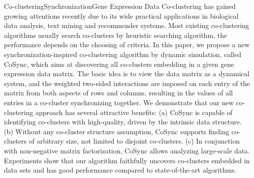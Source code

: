 
\addtocounter{page}{-1}
\begin{Eabstract}{Co-clustering}{Synchronization}{Gene Expression Data}{}{}
Co-clustering has gained growing attentions recently due to its wide practical applications in biological data analysis, text mining and recommender systems. Most existing co-clustering algorithms usually search co-clusters by heuristic searching algorithm, the performance depends on the choosing of criteria. In this paper, we propose a new synchronization-inspired co-clustering algorithm by dynamic simulation, called CoSync, which aims at discovering all co-clusters embedding in a given gene expression data matrix. The basic idea is to view the data matrix as a dynamical system, and the weighted two-sided interactions are imposed on each entry of the matrix from both aspects of rows and columns,  resulting in the values of all entries in a co-cluster synchronizing together. We demonstrate that our new co-clustering approach has several attractive benefits: (a) CoSync is capable of identifying co-clusters with high-quality, driven by the intrinsic data structure. (b) Without any co-cluster structure assumption, CoSync supports finding co-clusters of arbitrary size, not limited to disjoint co-clusters.  (c)  In conjunction with non-negative matrix factorization, CoSync allows analyzing large-scale data. Experiments show that our algorithm faithfully uncovers co-clusters embedded in data sets and has good performance compared to state-of-the-art algorithms.
\end{Eabstract}

\newpage\mbox{}\thispagestyle{empty}\newpage
\addtocounter{page}{-1}
